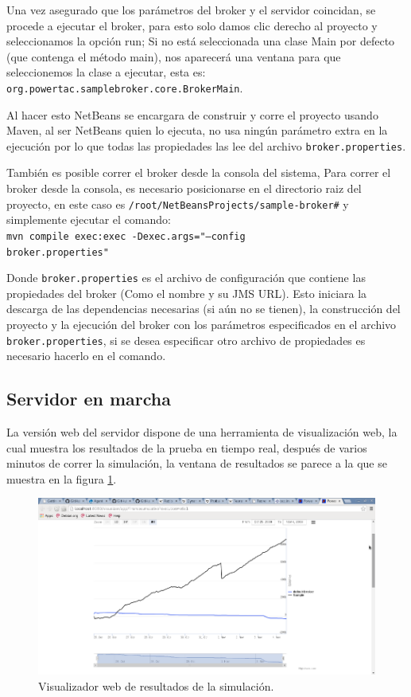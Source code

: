 Una vez asegurado que los parámetros del broker y el servidor coincidan, se procede a ejecutar el broker, para esto solo damos clic derecho al proyecto y seleccionamos la opción run; 
Si no está seleccionada una clase Main por defecto (que contenga el método main), nos aparecerá una ventana para que seleccionemos la clase a ejecutar, esta es:\\ \texttt{org.powertac.samplebroker.core.BrokerMain}.

Al hacer esto NetBeans se encargara de construir y corre el proyecto usando Maven, al ser NetBeans quien lo ejecuta, no usa ningún parámetro extra en la ejecución por lo que todas las propiedades las lee del archivo \texttt{broker.properties}.

También es posible correr el broker desde la consola del sistema, Para correr el broker desde la consola, es necesario posicionarse en el directorio raiz del proyecto, en este caso es \texttt{/root/NetBeansProjects/sample-broker\#} y simplemente ejecutar el comando:\\
\texttt{mvn compile exec:exec -Dexec.args="--config \\
broker.properties"\\
}

Donde \texttt{broker.properties} es el archivo de configuración que contiene las propiedades del broker (Como el nombre y su JMS URL).
Esto iniciara la descarga de las dependencias necesarias (si aún no se tienen), la construcción del proyecto y la ejecución del broker con los parámetros especificados en el archivo \texttt{broker.properties}, si se desea especificar otro archivo de propiedades es necesario hacerlo en el comando.

\subsection{Servidor en marcha}
La versión web del servidor dispone de una herramienta de visualización web, la cual muestra los resultados de la prueba en tiempo real, después de varios minutos de correr la simulación, la ventana de resultados se parece a la que se muestra en la figura \ref{fig:visualizadorWebResultados}.

\begin{figure}[h]
	\centering
	\includegraphics[width=13cm]{img/visualizadorWebResultados.png}
	\caption{Visualizador web de resultados de la simulación.}
	\label{fig:visualizadorWebResultados}
\end{figure}

